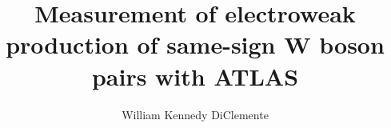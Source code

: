 
\title{Measurement of electroweak production of same-sign W boson pairs with ATLAS} 

\author{William Kennedy DiClemente}

\newcommand{\adviser}{I. Joseph Kroll, Professor, Physics}
\newcommand{\advisershort}{J. Kroll}

\newcommand{\myinstitution}{The University of Pennsylvania}

\newcommand{\chairperson}{Joshua Klein, Professor, Physics}

\newcommand{\committeeOne}{Elliot Lipeles, Associate Professor, Physics}
\newcommand{\committeeTwo}{Christopher Mauger, Associate Professor, Physics}
\newcommand{\committeeThree}{Burt Ovrut, Professor, Physics}
\newcommand{\committeeFour}{Justin Khoury, Professor, Physics}





